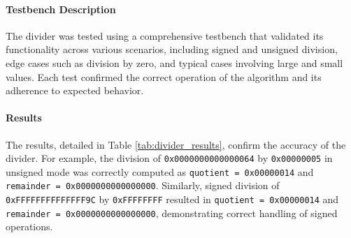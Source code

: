 \documentclass[12pt]{article}
\begin{document}
\paragraph{Testbench Description}
The divider was tested using a comprehensive testbench that validated its functionality across various scenarios, including signed and unsigned division, edge cases such as division by zero, and typical cases involving large and small values. Each test confirmed the correct operation of the algorithm and its adherence to expected behavior.

\paragraph{Results}
The results, detailed in Table \ref{tab:divider_results}, confirm the accuracy of the divider. For example, the division of \texttt{0x0000000000000064} by \texttt{0x00000005} in unsigned mode was correctly computed as \texttt{quotient = 0x00000014} and \texttt{remainder = 0x0000000000000000}. Similarly, signed division of \texttt{0xFFFFFFFFFFFFFF9C} by \texttt{0xFFFFFFFF} resulted in \texttt{quotient = 0x00000014} and \texttt{remainder = 0x0000000000000000}, demonstrating correct handling of signed operations.
\end{document}
